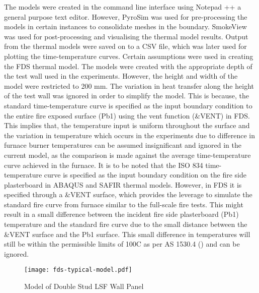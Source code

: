 The models were created in the command line interface using Notepad ++ a general purpose text editor. However, PyroSim was used for pre-processing the models in certain instances to consolidate meshes in the boundary. SmokeView was used for post-processing and visualising the thermal model results. Output from the thermal models were saved on to a CSV file, which was later used for plotting the time-temperature curves. Certain assumptions were used in creating the FDS thermal model. The models were created with the appropriate depth of the test wall used in the experiments. However, the height and width of the model were restricted to 200 mm. The variation in heat transfer along the height of the test wall was ignored in order to simplify the model. This is because, the standard time-temperature curve is specified as the input boundary condition to the entire fire exposed surface (Pb1) using the vent function (\&VENT) in FDS. This implies that, the temperature input is uniform throughout the surface and the variation in temperature which occurs in the experiments due to difference in furnace burner temperatures can be assumed insignificant and ignored in the current model, as the comparison is made against the average time-temperature curve achieved in the furnace. It is to be noted that the ISO 834 time-temperature curve is specified as the input boundary condition on the fire side plasterboard in ABAQUS and SAFIR thermal models. However, in FDS it is specified through a \&VENT surface, which provides the leverage to simulate the standard fire curve from furnace similar to the full-scale fire tests. This might result in a small difference between the incident fire side plasterboard (Pb1) temperature and the standard fire curve due to the small distance between the \&VENT surface and the Pb1 surface. This small difference in temperatures will still be within the permissible limits of 100\degree C as per AS 1530.4 (\citet{StandardsAustral2014}) and can be ignored.
\begin{figure}[!htbp]
	\centering
		\texttt{[image: fds-typical-model.pdf]}
		\caption{Model of Double Stud LSF Wall Panel}
		\label{fig:fds-typical-model}
\end{figure}

